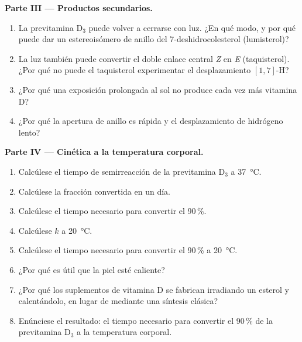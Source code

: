 \begin{problem}
\medskip\noindent\textbf{Parte III --- Productos secundarios.}
\begin{enumerate}[resume]
  \item La previtamina D$_3$ puede volver a cerrarse con luz. ¿En qué modo, y por qué puede dar un
        estereoisómero de anillo del 7-deshidrocolesterol (lumisterol)?
  \item La luz también puede convertir el doble enlace central \textit{Z} en \textit{E} (taquisterol). ¿Por qué
        no puede el taquisterol experimentar el desplazamiento $[1,7]$-H?
  \item ¿Por qué una exposición prolongada al sol no produce cada vez más vitamina D?
  \item ¿Por qué la apertura de anillo es rápida y el desplazamiento de hidrógeno lento?
\end{enumerate}

\medskip\noindent\textbf{Parte IV --- Cinética a la temperatura corporal.}
\begin{enumerate}[resume]
  \item Calcúlese el tiempo de semirreacción de la previtamina D$_3$ a \qty{37}{\celsius}.
  \item Calcúlese la fracción convertida en un día.
  \item Calcúlese el tiempo necesario para convertir el 90\,\%.
  \item Calcúlese $k$ a \qty{20}{\celsius}.
  \item Calcúlese el tiempo necesario para convertir el 90\,\% a \qty{20}{\celsius}.
  \item ¿Por qué es útil que la piel esté caliente?
  \item ¿Por qué los suplementos de vitamina D se fabrican irradiando un esterol y calentándolo,
        en lugar de mediante una síntesis clásica?
  \item Enúnciese el resultado: el tiempo necesario para convertir el 90\,\% de la previtamina D$_3$ a la temperatura corporal.
\end{enumerate}
\end{problem}
